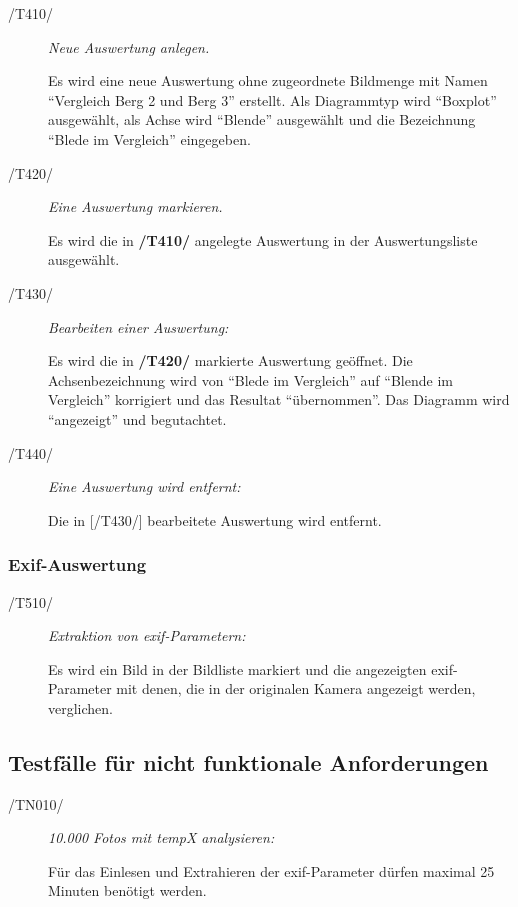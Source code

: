 		\begin{description}
		
			\item[/T410/] \textit{Neue Auswertung anlegen.}\par Es wird eine neue Auswertung ohne zugeordnete Bildmenge mit Namen "`Vergleich Berg 2 und Berg 3"' erstellt. Als Diagrammtyp wird "`Boxplot"' ausgewählt, als Achse wird "`Blende"' ausgewählt und die Bezeichnung "`Blede im Vergleich"' eingegeben.
			
			\item[/T420/] \textit{Eine Auswertung markieren.}\par Es wird die in \textbf{/T410/} angelegte Auswertung in der Auswertungsliste ausgewählt.
			
			\item[/T430/] \textit{Bearbeiten einer Auswertung:}\par Es wird die in \textbf{/T420/} markierte Auswertung geöffnet. Die Achsenbezeichnung wird von "`Blede im Vergleich"' auf "`Blende im Vergleich"' korrigiert und das Resultat "`übernommen"'. Das Diagramm wird "`angezeigt"' und begutachtet.
				
			\item[/T440/] \textit{Eine Auswertung wird entfernt:}\par Die in [/T430/] bearbeitete Auswertung wird entfernt.
							
		\end{description}
	
	\subsubsection{Exif-Auswertung}
	
		\begin{description}

			\item[/T510/] \textit{Extraktion von \gls{exif}-Parametern:}\par Es wird ein Bild in der Bildliste markiert und die angezeigten \gls{exif}-Parameter mit denen, die in der originalen Kamera angezeigt werden, verglichen.
			
		\end{description}
		
\subsection{Testfälle für nicht funktionale Anforderungen}
	
	\begin{description}
		
			\item[/TN010/] \textit{10.000 Fotos mit \gls{tempX} analysieren:}\par Für das Einlesen und Extrahieren der \gls{exif}-Parameter dürfen maximal 25 Minuten benötigt werden.
	
	\end{description}